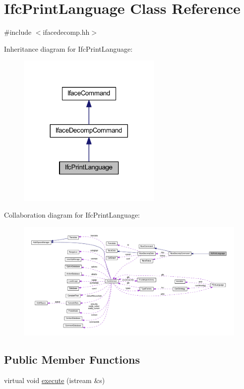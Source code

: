 \hypertarget{class_ifc_print_language}{}\section{Ifc\+Print\+Language Class Reference}
\label{class_ifc_print_language}


{\ttfamily \#include $<$ifacedecomp.\+hh$>$}



Inheritance diagram for Ifc\+Print\+Language\+:
\nopagebreak
\begin{figure}[H]
\begin{center}
\leavevmode
\includegraphics[width=197pt]{class_ifc_print_language__inherit__graph}
\end{center}
\end{figure}


Collaboration diagram for Ifc\+Print\+Language\+:
\nopagebreak
\begin{figure}[H]
\begin{center}
\leavevmode
\includegraphics[width=350pt]{class_ifc_print_language__coll__graph}
\end{center}
\end{figure}
\subsection*{Public Member Functions}
\begin{DoxyCompactItemize}
\item 
virtual void \mbox{\hyperlink{class_ifc_print_language_a2c1930cfbe6eedec2f55080358e4c9a7}{execute}} (istream \&s)
\end{DoxyCompactItemize}
